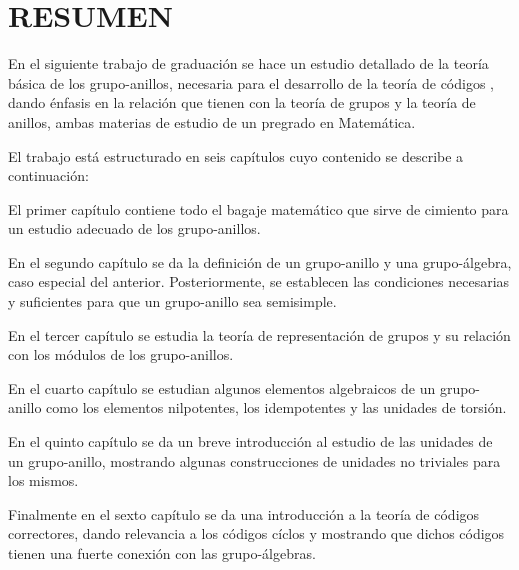 \chapter*{RESUMEN}
En el siguiente trabajo de graduación se hace un estudio detallado de la teoría básica de los grupo-anillos, necesaria para el desarrollo de la teoría de códigos , dando énfasis en la relación que tienen con la teoría de grupos y la teoría de anillos, ambas materias de estudio de un pregrado en Matemática.

El trabajo está estructurado en seis capítulos cuyo contenido se describe a continuación:

El primer capítulo contiene todo el bagaje matemático que sirve de cimiento para un  estudio adecuado de los grupo-anillos. 

En el segundo capítulo se da la definición de un grupo-anillo y una grupo-álgebra, caso especial del anterior. Posteriormente, se establecen las condiciones necesarias y suficientes para que un grupo-anillo sea semisimple. 

En el tercer capítulo se estudia la teoría de representación de grupos y su relación con los módulos de los grupo-anillos. 

En el cuarto capítulo se estudian algunos elementos algebraicos de un grupo-anillo como los elementos nilpotentes, los idempotentes y las unidades de torsión.

En el quinto capítulo se da un breve introducción al estudio de las unidades de un grupo-anillo, mostrando algunas construcciones de unidades no triviales para los mismos.

Finalmente en el sexto capítulo se da una introducción a la teoría de códigos correctores, dando relevancia a los códigos cíclos y mostrando que dichos códigos tienen una fuerte conexión con las grupo-álgebras.




